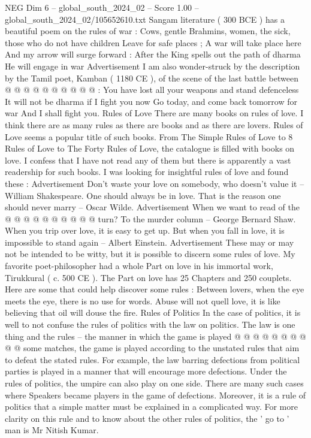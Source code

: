 \begin{textsample}{NEG Dim 6 – global\_south\_2024\_02 – Score 1.00 – global\_south\_2024\_02/105652610.txt}
Sangam literature ( 300 BCE ) has a beautiful poem on the rules of war : Cows, gentle Brahmins, women, the sick, those who do not have children Leave for safe places ; A war will take place here And my arrow will surge forward : After the King spells out the path of dharma He will engage in war Advertisement I am also wonder-struck by the description by the Tamil poet, Kamban ( 1180 CE ), of the scene of the last battle between @ @ @ @ @ @ @ @ @ @ : You have lost all your weapons and stand defenceless It will not be dharma if I fight you now Go today, and come back tomorrow for war And I shall fight you.
Rules of Love There are many books on rules of love.
I think there are as many rules as there are books and as there are lovers.
Rules of Love seems a popular title of such books.
From The Simple Rules of Love to 8 Rules of Love to The Forty Rules of Love, the catalogue is filled with books on love.
I confess that I have not read any of them but there is apparently a vast readership for such books.
I was looking for insightful rules of love and found these : Advertisement Don't waste your love on somebody, who doesn't value it -- William Shakespeare.
One should always be in love.
That is the reason one should never marry -- Oscar Wilde.
Advertisement When we want to read of the @ @ @ @ @ @ @ @ @ @ turn?
To the murder column -- George Bernard Shaw.
When you trip over love, it is easy to get up.
But when you fall in love, it is impossible to stand again -- Albert Einstein.
Advertisement These may or may not be intended to be witty, but it is possible to discern some rules of love.
My favorite poet-philosopher had a whole Part on love in his immortal work, Tirukkural ( c. 500 CE ).
The Part on love has 25 Chapters and 250 couplets.
Here are some that could help discover some rules : Between lovers, when the eye meets the eye, there is no use for words.
Abuse will not quell love, it is like believing that oil will douse the fire.
Rules of Politics In the case of politics, it is well to not confuse the rules of politics with the law on politics.
The law is one thing and the rules -- the manner in which the game is played @ @ @ @ @ @ @ @ @ @ some matches, the game is played according to the unstated rules that aim to defeat the stated rules.
For example, the law barring defections from political parties is played in a manner that will encourage more defections.
Under the rules of politics, the umpire can also play on one side.
There are many such cases where Speakers became players in the game of defections.
Moreover, it is a rule of politics that a simple matter must be explained in a complicated way.
For more clarity on this rule and to know about the other rules of politics, the ' go to ' man is Mr Nitish Kumar.

\end{textsample}

